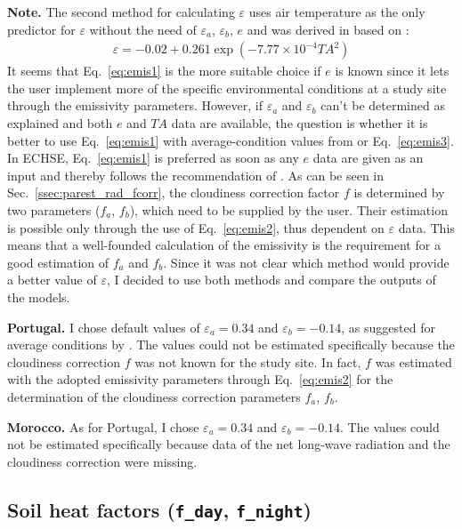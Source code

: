 \documentclass{scrreprt}
\begin{document}
\textbf{Note.}
The second method for calculating $\varepsilon$ uses air temperature as the only predictor for $\varepsilon$ without the need of $\varepsilon_a$, $\varepsilon_b$, $e$ and was derived in \citet{maidment93} based on \citet{idso69}:
\begin{align} \label{eq:emis3}
  \varepsilon = -0.02 + 0.261 \exp(-7.77 \times 10^{-4} TA^2)
\end{align}
%
It seems that Eq.~\eqref{eq:emis1} is the more suitable choice if $e$ is known since it lets the user implement more of the specific environmental conditions at a study site through the emissivity parameters.
However, if $\varepsilon_a$ and $\varepsilon_b$ can't be determined as explained and both $e$ and $TA$ data are available, the question is whether it is better to use Eq.~\eqref{eq:emis1} with average-condition values from \citet{maidment93} or Eq.~\eqref{eq:emis3}.
In ECHSE, Eq.~\eqref{eq:emis1} is preferred as soon as any $e$ data are given as an input and thereby follows the recommendation of \citet{maidment93}.
As can be seen in Sec.~\ref{ssec:parest_rad_fcorr}, the cloudiness correction factor $f$ is determined by two parameters ($f_a$, $f_b$), which need to be supplied by the user.
Their estimation is possible only through the use of Eq.~\eqref{eq:emis2}, thus dependent on $\varepsilon$ data.
This means that a well-founded calculation of the emissivity is the requirement for a good estimation of $f_a$ and $f_b$.
Since it was not clear which method would provide a better value of $\varepsilon$, I decided to use both methods and compare the outputs of the models.

\textbf{Portugal.}
I chose default values of $\varepsilon_a = 0.34$ and $\varepsilon_b = -0.14$, as suggested for average conditions by \citet{maidment93}.
The values could not be estimated specifically because the cloudiness correction $f$ was not known for the study site.
In fact, $f$ was estimated with the adopted emissivity parameters through Eq.~\eqref{eq:emis2} for the determination of the cloudiness correction parameters $f_a$, $f_b$.

\textbf{Morocco.}
As for Portugal, I chose $\varepsilon_a = 0.34$ and $\varepsilon_b = -0.14$.
The values could not be estimated specifically because data of the net long-wave radiation and the cloudiness correction were missing.

\subsection{Soil heat factors (\texttt{f\_day}, \texttt{f\_night})} \label{ssec:parest_rad_f}
\end{document}
